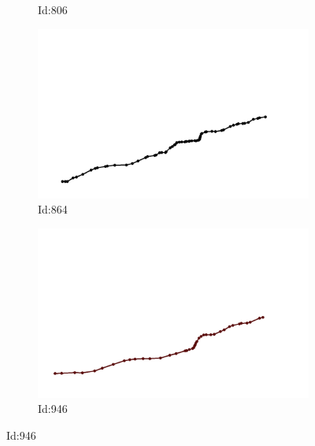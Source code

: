 \documentclass[12pt,twoside]{report}
\begin{document}
\begin{figure}
\begin{subfigure}[b]{0.20\textwidth}
\caption{Id:806}
\end{subfigure}
\begin{subfigure}[b]{0.20\textwidth}
\centering
\includegraphics[width=\textwidth]{../../trajectories/864.png}
\caption{Id:864}
\end{subfigure}
\begin{subfigure}[b]{0.20\textwidth}
\centering
\includegraphics[width=\textwidth]{../../trajectories/946.png}
\caption{Id:946}
\end{subfigure}
\end{figure}
\end{document}
